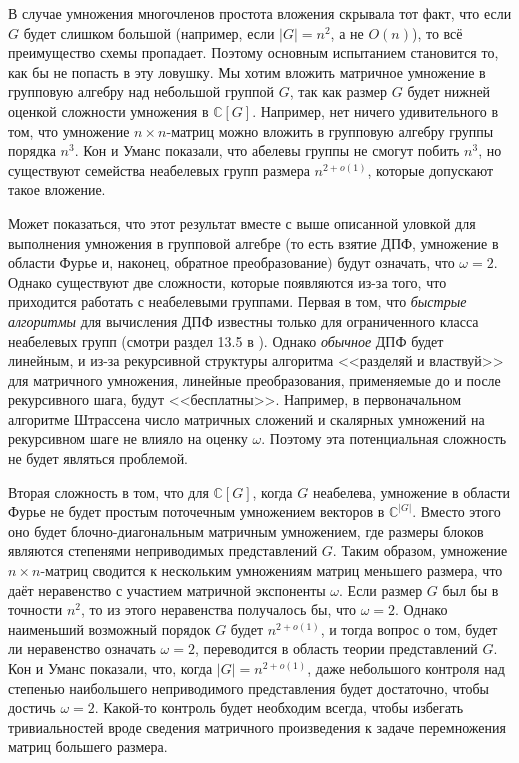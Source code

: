 В случае умножения многочленов простота вложения скрывала тот факт, что если $G$ будет слишком большой (например, если $|G|=n^2$, а не $O(n)$), то всё преимущество схемы пропадает. Поэтому основным испытанием становится то, как бы не попасть в эту ловушку. Мы хотим вложить матричное умножение в групповую алгебру над небольшой группой $G$, так как размер $G$ будет нижней оценкой сложности умножения в $\mathbb{C}[G]$. Например, нет ничего удивительного в том, что умножение $n \times n$-матриц можно вложить в групповую алгебру группы порядка $n^3$. Кон и Уманс показали, что абелевы группы не смогут побить $n^3$, но существуют семейства неабелевых групп размера $n^{2+o(1)}$, которые допускают такое вложение.

Может показаться, что этот результат вместе с выше описанной уловкой для выполнения умножения в групповой алгебре (то есть взятие ДПФ, умножение в области Фурье и, наконец, обратное преобразование) будут означать, что $\omega=2$. Однако существуют две сложности, которые появляются из-за того, что приходится работать с неабелевыми группами. Первая в том, что \textit{быстрые алгоритмы} для вычисления ДПФ известны только для ограниченного класса неабелевых групп (смотри раздел 13.5 в \cite{bur}). Однако \textit{обычное} ДПФ будет линейным, и из-за рекурсивной структуры алгоритма <<разделяй и властвуй>> для матричного умножения, линейные преобразования, применяемые до и после рекурсивного шага, будут <<бесплатны>>. Например, в первоначальном алгоритме Штрассена число матричных сложений и скалярных умножений на рекурсивном шаге не влияло на оценку $\omega$. Поэтому эта потенциальная сложность не будет являться проблемой.

Вторая сложность в том, что для $\mathbb{C}[G]$, когда $G$ неабелева, умножение в области Фурье не будет простым поточечным умножением векторов в $\mathbb{C}^{|G|}$. Вместо этого оно будет блочно-диагональным матричным умножением, где размеры блоков являются степенями неприводимых представлений $G$. Таким образом, умножение $n \times n$-матриц сводится к нескольким умножениям матриц меньшего размера, что даёт неравенство с участием матричной экспоненты $\omega$. Если размер $G$ был бы в точности $n^2$, то из этого неравенства получалось бы, что $\omega=2$. Однако наименьший возможный порядок $G$ будет $n^{2+o(1)}$, и тогда вопрос о том, будет ли неравенство означать $\omega=2$, переводится в область теории представлений $G$. Кон и Уманс показали, что, когда $|G|=n^{2+o(1)}$, даже небольшого контроля над степенью наибольшего неприводимого представления будет достаточно, чтобы достичь $\omega=2$. Какой-то контроль будет необходим всегда, чтобы избегать тривиальностей вроде сведения матричного произведения к задаче перемножения матриц большего размера.


